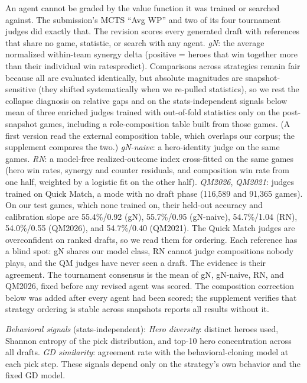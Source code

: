 \documentclass[journal]{IEEEtran}
\providecommand{\DIFaddtex}[1]{{\protect\color{blue} \sf #1}} %
\providecommand{\DIFdeltex}[1]{{\protect\color{red} \scriptsize #1}} %
\providecommand{\DIFaddbegin}{} %
\providecommand{\DIFaddend}{} %
\providecommand{\DIFdelbegin}{} %
\providecommand{\DIFdelend}{} %
\providecommand{\DIFadd}[1]{\texorpdfstring{\DIFaddtex{#1}}{#1}} %
\providecommand{\DIFdel}[1]{\texorpdfstring{\DIFdeltex{#1}}{}} %
\begin{document}
\DIFadd{An agent cannot be graded by the value function it was trained or searched against. The submission's MCTS ``Avg WP'' and two of its four tournament judges did exactly that. The revision scores every generated draft with references that share no game, statistic, or search with any agent. \textit{gN}: }\DIFaddend the \DIFdelbegin \DIFdel{average normalized within-team synergy delta (positive = heroes that win together more than their individual win ratespredict). Comparisons across strategies remain fair because all are evaluated identically, but absolute magnitudes are snapshot-sensitive (they shifted systematically when we re-pulled statistics), so we rest the collapse diagnosis on relative gaps and on the stats-independent signals below }\DIFdelend \DIFaddbegin \DIFadd{mean of three enriched judges trained with out-of-fold statistics only on the post-snapshot games, including a role-composition table built from those games. (A first version read the external composition table, which overlaps our corpus; the supplement compares the two.) \textit{gN-naive}: a hero-identity judge on the same games. \textit{RN}: a model-free realized-outcome index cross-fitted on the same games (hero win rates, synergy and counter residuals, and composition win rate from one half, weighted by a logistic fit on the other half). \textit{QM2026}, \textit{QM2021}: judges trained on Quick Match, a mode with no draft phase (116,589 and 91,365 games). On our test games, which none trained on, their held-out accuracy and calibration slope are 55.4\%/0.92 (gN), 55.7\%/0.95 (gN-naive), 54.7\%/1.04 (RN), 54.0\%/0.55 (QM2026), and 54.7\%/0.40 (QM2021). The Quick Match judges are overconfident on ranked drafts, so we read them for ordering. Each reference has a blind spot: gN shares our model class, RN cannot judge compositions nobody plays, and the QM judges have never seen a draft. The evidence is their agreement. The tournament consensus is the mean of gN, gN-naive, RN, and QM2026, fixed before any revised agent was scored. The composition correction below was added after every agent had been scored}\DIFaddend ; the supplement \DIFdelbegin \DIFdel{verifies that strategy ordering is stable across snapshots}\DIFdelend \DIFaddbegin \DIFadd{reports all results without it}\DIFaddend .

\DIFdelbegin \DIFdel{\textit{Behavioral signals} (stats-independent): \textit{Hero diversity}: distinct heroes used, Shannon entropy of the pick distribution, and top-10 hero concentration across all drafts. \textit{GD similarity}: agreement rate with the behavioral-cloning model at each pick step. These signals depend only on the strategy's own behavior and the fixed GD model. }%
\end{document}
